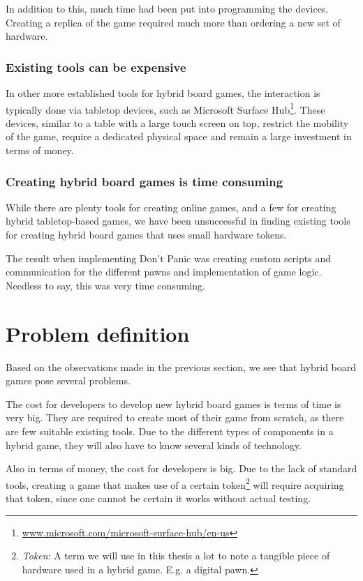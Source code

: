 In addition to this, much time had been put into programming the devices. Creating a replica of the game required much more than ordering a new set of hardware.

\subsubsection{Existing tools can be expensive}
In other more established tools for hybrid board games, the interaction is typically done via tabletop devices\cite{al2008designing}, such as Microsoft Surface Hub\footnote{\href{https://www.microsoft.com/microsoft-surface-hub/en-us}{www.microsoft.com/microsoft-surface-hub/en-us}}. These devices, similar to a table with a large touch screen on top, restrict the mobility of the game, require a dedicated physical space and remain a large investment in terms of money.

\subsubsection{Creating hybrid board games is time consuming}
While there are plenty tools for creating online games, and a few for creating hybrid tabletop-based games, we have been unsuccessful in finding existing tools for creating hybrid board games that uses small hardware tokens. 

The result when implementing Don't Panic was creating custom scripts and communication for the different pawns and implementation of game logic. Needless to say, this was very time consuming.

\section{Problem definition}
Based on the observations made in the previous section, we see that hybrid board games pose several problems.

The cost for developers to develop new hybrid board games is terms of time is very big. They are required to create most of their game from scratch, as there are few suitable existing tools. Due to the different types of components in a hybrid game, they will also have to know several kinds of technology.

Also in terms of money, the cost for developers is big. Due to the lack of standard tools, creating a game that makes use of a certain token\footnote{\emph{Token}: A term we will use in this thesis a lot to note a tangible piece of hardware used in a hybrid game. E.g. a digital pawn.} will require acquiring that token, since one cannot be certain it works without actual testing.

